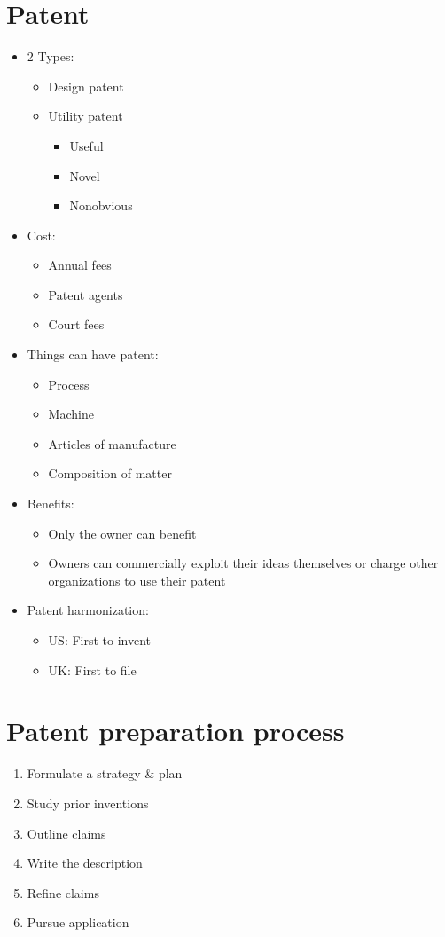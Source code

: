 \documentclass[openany,12pt,a4paper]{book}
\begin{document}
\section{Patent}
\begin{itemize}
    \item 2 Types:
    \begin{itemize}
        \item Design patent
        \item Utility patent
        \begin{itemize}
            \item Useful
            \item Novel
            \item Nonobvious
        \end{itemize}
    \end{itemize}
    \item Cost:
    \begin{itemize}
        \item Annual fees
        \item Patent agents
        \item Court fees
    \end{itemize}
    \item Things can have patent:
    \begin{itemize}
        \item Process
        \item Machine
        \item Articles of manufacture
        \item Composition of matter
    \end{itemize}
    \item Benefits:
    \begin{itemize}
        \item Only the owner can benefit
        \item Owners can commercially exploit their ideas themselves or charge other organizations to use their patent
    \end{itemize}
    \item Patent harmonization:
    \begin{itemize}
        \item US: First to invent
        \item UK: First to file
    \end{itemize}
\end{itemize}
\section{Patent preparation process}
\begin{enumerate}
    \item Formulate a strategy \& plan
    \item Study prior inventions
    \item Outline claims
    \item Write the description
    \item Refine claims
    \item Pursue application
\end{enumerate}
\end{document}
